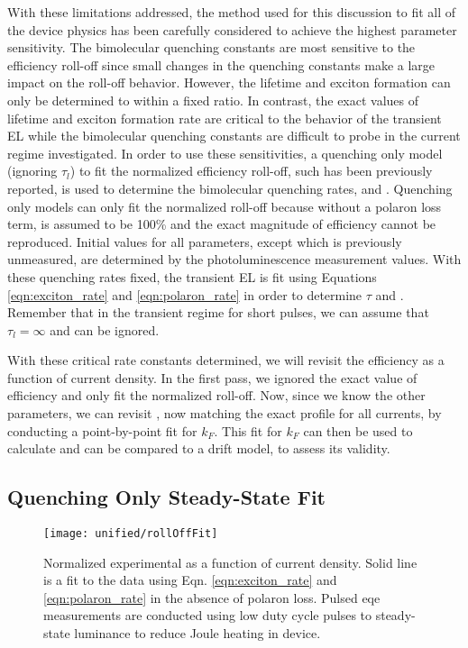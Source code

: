 \documentclass[../thesis.tex]{subfiles}
\begin{document}
With these limitations addressed, the method used for this discussion to fit all of the device physics has been carefully considered to achieve the highest parameter sensitivity.
The bimolecular quenching constants are most sensitive to the efficiency roll-off since small changes in the quenching constants make a large impact on the roll-off behavior.
However, the lifetime and exciton formation can only be determined to within a fixed ratio.
In contrast, the exact values of lifetime and exciton formation rate are critical to the behavior of the transient EL while the bimolecular quenching constants are difficult to probe in the current regime investigated.
In order to use these sensitivities, a quenching only model (ignoring $\tau_l$) to fit the normalized efficiency roll-off, such has been previously reported, is used to determine the bimolecular quenching rates, \ktt and \ktp.  
Quenching only models can only fit the normalized \eqe roll-off because without a polaron loss term, \ef is assumed to be 100\% and the exact magnitude of efficiency cannot be reproduced.
Initial values for all parameters, except \kf which is previously unmeasured, are determined by the photoluminescence measurement values.
With these quenching rates fixed, the transient EL is fit using Equations \ref{eqn:exciton_rate} and \ref{eqn:polaron_rate} in order to determine $\tau$ and \kf.
Remember that in the transient regime for short pulses, we can assume that $\tau_l=\infty$ and can be ignored.

With these critical rate constants determined, we will revisit the efficiency as a function of current density.
In the first pass, we ignored the exact value of efficiency and only fit the normalized roll-off.
Now, since we know the other parameters, we can revisit \eqe, now matching the exact profile for all currents, by conducting a point-by-point fit for $k_F$.
This fit for $k_F$ can then be used to calculate \ef and can be compared to a drift model, to assess its validity.


\subsection{Quenching Only Steady-State Fit}\label{sec:eqe_fitting}

\begin{wrapfigure}{R}{0.5\textwidth}
\texttt{[image: unified/rollOffFit]}
\caption{Normalized experimental \eqe as a function of current density.  Solid line is a fit to the data using Eqn. \ref{eqn:exciton_rate} and \ref{eqn:polaron_rate} in the absence of polaron loss.  Pulsed eqe measurements are conducted using low duty cycle pulses to steady-state luminance to reduce Joule heating in device.}
\label{fig:rollOffFit}
\end{wrapfigure}
\end{document}
